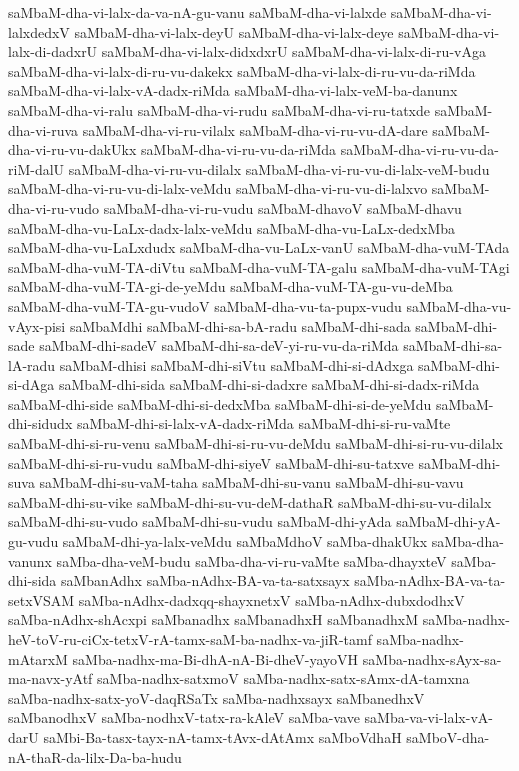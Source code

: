 {saMbaM-dha-vi-lalx-da-va-nA-gu-vanu
saMbaM-dha-vi-lalxde
saMbaM-dha-vi-lalxdedxV
saMbaM-dha-vi-lalx-deyU
saMbaM-dha-vi-lalx-deye
saMbaM-dha-vi-lalx-di-dadxrU
saMbaM-dha-vi-lalx-didxdxrU
saMbaM-dha-vi-lalx-di-ru-vAga
saMbaM-dha-vi-lalx-di-ru-vu-dakekx
saMbaM-dha-vi-lalx-di-ru-vu-da-riMda
saMbaM-dha-vi-lalx-vA-dadx-riMda
saMbaM-dha-vi-lalx-veM-ba-danunx
saMbaM-dha-vi-ralu
saMbaM-dha-vi-rudu
saMbaM-dha-vi-ru-tatxde
saMbaM-dha-vi-ruva
saMbaM-dha-vi-ru-vilalx
saMbaM-dha-vi-ru-vu-dA-dare
saMbaM-dha-vi-ru-vu-dakUkx
saMbaM-dha-vi-ru-vu-da-riMda
saMbaM-dha-vi-ru-vu-da-riM-dalU
saMbaM-dha-vi-ru-vu-dilalx
saMbaM-dha-vi-ru-vu-di-lalx-veM-budu
saMbaM-dha-vi-ru-vu-di-lalx-veMdu
saMbaM-dha-vi-ru-vu-di-lalxvo
saMbaM-dha-vi-ru-vudo
saMbaM-dha-vi-ru-vudu
saMbaM-dhavoV
saMbaM-dhavu
saMbaM-dha-vu-LaLx-dadx-lalx-veMdu
saMbaM-dha-vu-LaLx-dedxMba
saMbaM-dha-vu-LaLxdudx
saMbaM-dha-vu-LaLx-vanU
saMbaM-dha-vuM-TAda
saMbaM-dha-vuM-TA-diVtu
saMbaM-dha-vuM-TA-galu
saMbaM-dha-vuM-TAgi
saMbaM-dha-vuM-TA-gi-de-yeMdu
saMbaM-dha-vuM-TA-gu-vu-deMba
saMbaM-dha-vuM-TA-gu-vudoV
saMbaM-dha-vu-ta-pupx-vudu
saMbaM-dha-vu-vAyx-pisi
saMbaMdhi
saMbaM-dhi-sa-bA-radu
saMbaM-dhi-sada
saMbaM-dhi-sade
saMbaM-dhi-sadeV
saMbaM-dhi-sa-deV-yi-ru-vu-da-riMda
saMbaM-dhi-sa-lA-radu
saMbaM-dhisi
saMbaM-dhi-siVtu
saMbaM-dhi-si-dAdxga
saMbaM-dhi-si-dAga
saMbaM-dhi-sida
saMbaM-dhi-si-dadxre
saMbaM-dhi-si-dadx-riMda
saMbaM-dhi-side
saMbaM-dhi-si-dedxMba
saMbaM-dhi-si-de-yeMdu
saMbaM-dhi-sidudx
saMbaM-dhi-si-lalx-vA-dadx-riMda
saMbaM-dhi-si-ru-vaMte
saMbaM-dhi-si-ru-venu
saMbaM-dhi-si-ru-vu-deMdu
saMbaM-dhi-si-ru-vu-dilalx
saMbaM-dhi-si-ru-vudu
saMbaM-dhi-siyeV
saMbaM-dhi-su-tatxve
saMbaM-dhi-suva
saMbaM-dhi-su-vaM-taha
saMbaM-dhi-su-vanu
saMbaM-dhi-su-vavu
saMbaM-dhi-su-vike
saMbaM-dhi-su-vu-deM-dathaR
saMbaM-dhi-su-vu-dilalx
saMbaM-dhi-su-vudo
saMbaM-dhi-su-vudu
saMbaM-dhi-yAda
saMbaM-dhi-yA-gu-vudu
saMbaM-dhi-ya-lalx-veMdu
saMbaMdhoV
saMba-dhakUkx
saMba-dha-vanunx
saMba-dha-veM-budu
saMba-dha-vi-ru-vaMte
saMba-dhayxteV
saMba-dhi-sida
saMbanAdhx
saMba-nAdhx-BA-va-ta-satxsayx
saMba-nAdhx-BA-va-ta-setxVSAM
saMba-nAdhx-dadxqq-shayxnetxV
saMba-nAdhx-dubxdodhxV
saMba-nAdhx-shAcxpi
saMbanadhx
saMbanadhxH
saMbanadhxM
saMba-nadhx-heV-toV-ru-ciCx-tetxV-rA-tamx-saM-ba-nadhx-va-jiR-tamf
saMba-nadhx-mAtarxM
saMba-nadhx-ma-Bi-dhA-nA-Bi-dheV-yayoVH
saMba-nadhx-sAyx-sa-ma-navx-yAtf
saMba-nadhx-satxmoV
saMba-nadhx-satx-sAmx-dA-tamxna
saMba-nadhx-satx-yoV-daqRSaTx
saMba-nadhxsayx
saMbanedhxV
saMbanodhxV
saMba-nodhxV-tatx-ra-kAleV
saMba-vave
saMba-va-vi-lalx-vA-darU
saMbi-Ba-tasx-tayx-nA-tamx-tAvx-dAtAmx
saMboVdhaH
saMboV-dha-nA-thaR-da-lilx-Da-ba-hudu
}
